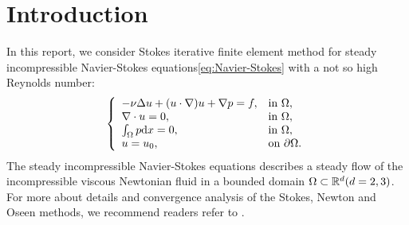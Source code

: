 \section{Introduction}
In this report, we consider Stokes iterative finite element method\cite{xu2013some} 
for steady incompressible Navier-Stokes equations\eqref{eq:Navier-Stokes} 
with a not so high Reynolds number:
\begin{equation}\label{eq:Navier-Stokes}
  \left\{
    \begin{array}{ll}
      -\nu\Delta u+(u\cdot\nabla)u+\nabla p=f, & \text{in } \Omega, \\
      \nabla\cdot u=0,                         & \text{in } \Omega, \\
      \int_\Omega p\mathrm{d} x = 0,                 & \text{in } \Omega, \\
      u = u_0,                                  & \text{on } \partial\Omega.
    \end{array}
    \right.
\end{equation}
The steady incompressible Navier-Stokes equations describes 
a steady flow of the incompressible viscous Newtonian fluid 
in a bounded domain $\Omega\subset\mathbb{R}^d(d=2,3)$. 
For more about details and convergence analysis of the 
Stokes, Newton and Oseen methods, 
we recommend readers refer to \cite{xu2013some,he2015stability}
\cite[Chapter~6]{john2016finite}.

